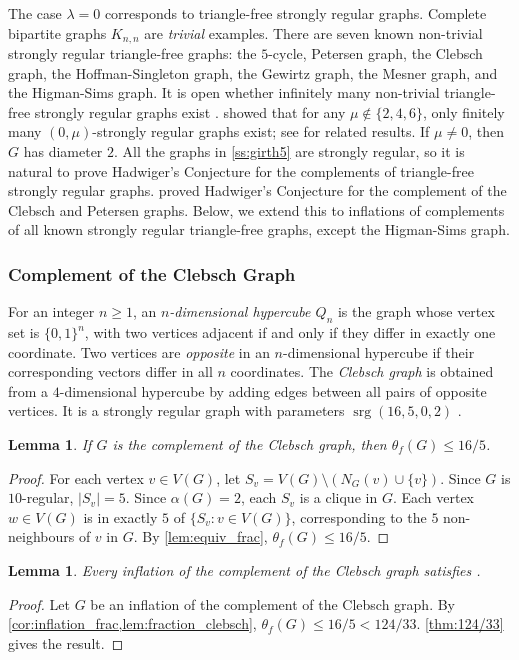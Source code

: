 \documentclass[11pt]{article}
\numberwithin{equation}{section}
\theoremstyle{plain}
\newtheorem{lem}[equation]{Lemma}
\theoremstyle{definition}
\renewcommand{\geq}{\geqslant}
\renewcommand{\leq}{\leqslant}
\DeclareMathOperator{\srg}{srg}
\newcommand{\defn}[1]{\textcolor{green!50!black}{\textit{#1}}}
\begin{document}
The case $\lambda = 0$ corresponds to triangle-free strongly regular graphs. Complete bipartite graphs $K_{n,n}$ are \defn{trivial} examples. There are seven known non-trivial strongly regular triangle-free graphs: the $5$-cycle, Petersen graph, the Clebsch graph, the Hoffman-Singleton graph, the Gewirtz graph, the Mesner graph, and the Higman-Sims graph. It is open whether infinitely many non-trivial triangle-free strongly regular graphs exist \citep{devillers2024triangle}. \citet{Biggs71a} showed that for any $\mu \notin \{2, 4, 6\}$, only finitely many $(0, \mu)$-strongly regular graphs exist; see
\citep{Biggs09a,Biggs09,Biggs11,Elzinga03} for related results. If $\mu \neq 0$, then $G$ has diameter $2$. All the graphs in \cref{ss:girth5} are strongly regular, so it is natural to prove Hadwiger's Conjecture for the complements of triangle-free strongly regular graphs. \citet{xu_hadwigers_2025} proved Hadwiger's Conjecture for the complement of the Clebsch and Petersen graphs. Below, we extend this to inflations of complements of all known strongly regular triangle-free graphs, except the Higman-Sims graph.

\subsubsection{Complement of the Clebsch Graph}
\label{sss:clebsch}
For an integer $n \geq 1$, an \defn{$n$-dimensional hypercube $Q_n$} is the graph whose vertex set is $\{0,1\}^n$, with two vertices adjacent if and only if they differ in exactly one coordinate. Two vertices are \defn{opposite} in an $n$-dimensional hypercube if their corresponding vectors differ in all $n$ coordinates. The \defn{Clebsch graph} is obtained from a $4$-dimensional hypercube by adding edges between all pairs of opposite vertices. It is a strongly regular graph with parameters $\srg(16,5,0,2)$ \citep{Clebsch}.
\begin{lem}
    \label{lem:fraction_clebsch}
    If $G$ is the complement of the Clebsch graph, then $\theta_f(G) \leq 16/5$.
\end{lem}
\begin{proof}
    For each vertex $v \in V(G)$, let $S_v = V(G) \setminus (N_G(v) \cup \{v\})$. Since $G$ is $10$-regular, $|S_v| = 5$.
    Since $\alpha(G) = 2$, each $S_v$ is a clique in $G$. Each vertex $w \in V(G)$ is in exactly $5$ of $\{S_v : v \in V(G)\}$, corresponding to the $5$ non-neighbours of $v$ in $G$. By \cref{lem:equiv_frac}, $\theta_f(G) \leq 16/5$.
\end{proof}
\begin{lem}
    \label{lem:inflation_clebsch}
    Every inflation of the complement of the Clebsch graph satisfies .
\end{lem}
\begin{proof}
    Let $G$ be an inflation of the complement of the Clebsch graph.
    By \cref{cor:inflation_frac,lem:fraction_clebsch}, $\theta_f(G) \leq 16/5 < 124/33$. \cref{thm:124/33} gives the result.
\end{proof}
\end{document}
